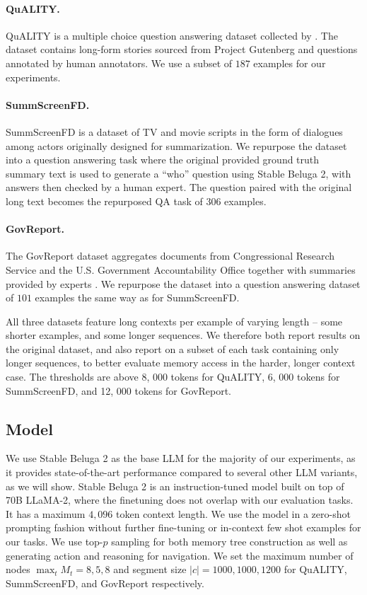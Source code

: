\paragraph{QuALITY.} QuALITY is a multiple choice question answering dataset collected by \cite{pang2022quality}. The dataset contains long-form stories sourced from Project Gutenberg and questions annotated by human annotators. We use a subset of $187$ examples for our experiments.

\paragraph{SummScreenFD.} SummScreenFD \citep{chen2022summscreen} is a dataset of TV and movie scripts in the form of dialogues among actors originally designed for summarization. We repurpose the dataset into a question answering task where the original provided ground truth summary text is used to generate a ``who'' question using Stable Beluga 2, with answers then checked by a human expert. The question paired with the original long text becomes %
the repurposed QA task of $306$ examples.

\paragraph{GovReport.} The GovReport dataset aggregates documents from Congressional Research Service and the U.S. Government Accountability Office together with summaries provided by experts \citep{huang2021efficient}. We repurpose the dataset into a question answering dataset of $101$ examples the same way as for SummScreenFD.

All three datasets feature long contexts per example of varying length -- some shorter examples, and some longer sequences. We therefore both report results on the original dataset, and also report on a subset of each task containing only longer sequences, to better evaluate memory access in the harder, longer context case.  The thresholds are above 8, 000 tokens for QuALITY, 6, 000 tokens for SummScreenFD, and 12, 000 tokens for GovReport.

\subsection{Model}
We use Stable Beluga 2 \citep{StableBelugaModels} as the base LLM for the majority of our experiments, as it provides  state-of-the-art performance compared to several other LLM variants, as we will show. 
Stable Beluga 2 is an instruction-tuned model
built on top of  70B LLaMA-2\citep{touvron2023llama2}, where the finetuning does not overlap with our evaluation tasks.
It has a maximum $4,096$ token context length.
We use the model in a zero-shot prompting fashion without further fine-tuning or in-context few shot examples for our tasks. We use top-$p$ sampling for both memory tree construction as well as generating action and reasoning for navigation. We set the maximum number of nodes $\max_t M_t = 8, 5, 8$ and segment size $\lvert c \rvert = 1000, 1000, 1200$ for QuALITY, SummScreenFD, and GovReport respectively.

